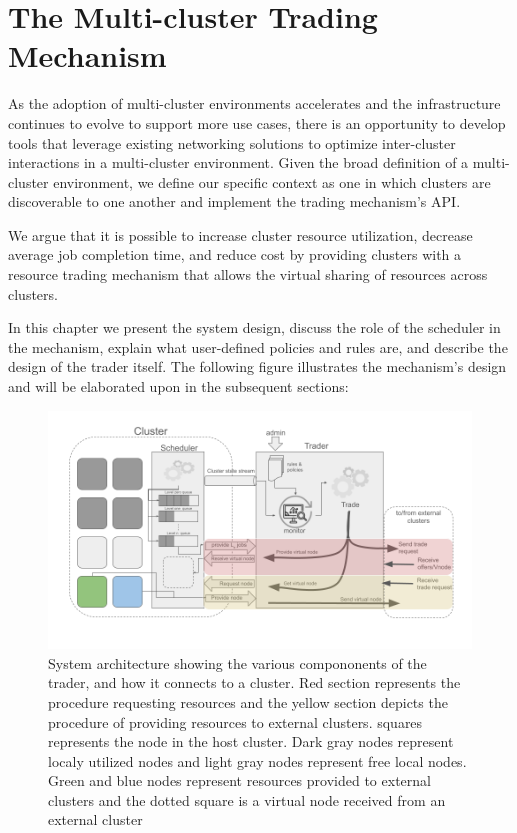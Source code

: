 
\chapter{The Multi-cluster Trading Mechanism}

As the adoption of multi-cluster environments accelerates and the
infrastructure continues to evolve to support more use cases, there is an
opportunity to develop tools that leverage existing networking solutions to
optimize inter-cluster interactions in a multi-cluster environment. Given the
broad definition of a multi-cluster environment, we define our specific context
as one in which clusters are discoverable to one another and implement the
trading mechanism's API.

We argue that it is possible to increase cluster resource utilization, decrease
average job completion time, and reduce cost by providing clusters with a
resource trading mechanism that allows the virtual sharing of resources across
clusters. 

In this chapter we present the system design, discuss the role of the scheduler
in the mechanism, explain what user-defined policies and rules are, and
describe the design of the trader itself. The following figure illustrates the
mechanism's design and will be elaborated upon in the subsequent sections: 

\begin{figure}[H]
  \centerline{\includegraphics[scale=0.45]{figures/system-diagram}}
  \caption{System architecture showing the various compononents of the trader,
    and how it connects to a cluster. Red section represents the procedure
    requesting resources and the yellow section depicts the procedure of
    providing resources to external clusters. squares represents the node in
    the host cluster. Dark gray nodes represent localy utilized nodes and light
    gray nodes represent free local nodes. Green and blue nodes represent
    resources    provided to external clusters and the dotted square is a
    virtual node received from an external cluster} 
\end{figure}

